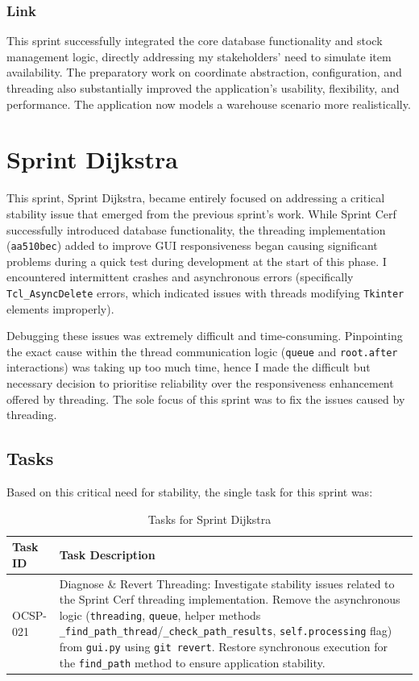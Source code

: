 \subsubsection{Link}
This sprint successfully integrated the core database functionality and stock management logic, directly addressing my stakeholders' need to simulate item availability. The preparatory work on coordinate abstraction, configuration, and threading also substantially improved the application's usability, flexibility, and performance. The application now models a warehouse scenario more realistically.

\newpage

\section{Sprint Dijkstra}

This sprint, Sprint Dijkstra, became entirely focused on addressing a critical stability issue that emerged from the previous sprint's work. While Sprint Cerf successfully introduced database functionality, the threading implementation (\verb|aa510bec|) added to improve GUI responsiveness began causing significant problems during a quick test during development at the start of this phase. I encountered intermittent crashes and asynchronous errors (specifically \verb|Tcl_AsyncDelete| errors, which indicated issues with threads modifying \verb|Tkinter| elements improperly).

Debugging these issues was extremely difficult and time-consuming. Pinpointing the exact cause within the thread communication logic (\verb|queue| and \verb|root.after| interactions) was taking up too much time, hence I made the difficult but necessary decision to prioritise reliability over the responsiveness enhancement offered by threading. The sole focus of this sprint was to fix the issues caused by threading.

\subsection{Tasks}

Based on this critical need for stability, the single task for this sprint was:
\begin{table}[htbp]
	\centering
	\begin{tabularx}{\textwidth}{|l|X|}
		\hline
		\textbf{Task ID} & \textbf{Task Description} \\
		\hline
		OCSP-021 & Diagnose \& Revert Threading: Investigate stability issues related to the Sprint Cerf threading implementation. Remove the asynchronous logic (\verb|threading|, \verb|queue|, helper methods \verb|_find_path_thread|/\verb|_check_path_results|, \verb|self.processing| flag) from \verb|gui.py| using \verb|git revert|. Restore synchronous execution for the \verb|find_path| method to ensure application stability. \\
		\hline
	\end{tabularx}
	\caption{Tasks for Sprint Dijkstra}
\end{table}

